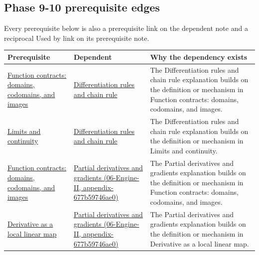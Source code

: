\subsection{Phase 9-10 prerequisite edges}\label{appendix-4ad47bdd269a-phase-9-10-prerequisite-edges}

Every prerequisite below is also a prerequisite link on the dependent note and a reciprocal Used by link on its prerequisite note.

{\def\LTcaptype{none} %
\begin{longtable}[]{@{}
  >{\raggedright\arraybackslash}p{}
  >{\raggedright\arraybackslash}p{}
  >{\raggedright\arraybackslash}p{}@{}}
\toprule\noalign{}
\begin{minipage}[b]{\linewidth}\raggedright
Prerequisite
\end{minipage} & \begin{minipage}[b]{\linewidth}\raggedright
Dependent
\end{minipage} & \begin{minipage}[b]{\linewidth}\raggedright
Why the dependency exists
\end{minipage} \\
\midrule\noalign{}
\endhead
\bottomrule\noalign{}
\endlastfoot
\hyperref[appendix-a59658325cd6]{Function contracts: domains, codomains, and images} & \hyperref[appendix-d9f70bdfbc92]{Differentiation rules and chain rule} & The Differentiation rules and chain rule explanation builds on the definition or mechanism in Function contracts: domains, codomains, and images. \\
\hyperref[appendix-fecc1847f5a3]{Limits and continuity} & \hyperref[appendix-d9f70bdfbc92]{Differentiation rules and chain rule} & The Differentiation rules and chain rule explanation builds on the definition or mechanism in Limits and continuity. \\
\hyperref[appendix-a59658325cd6]{Function contracts: domains, codomains, and images} & \href{../06-Engine-II/main.pdf\#nameddest=appendix-677b59746ae0}{Partial derivatives and gradients (06-Engine-II, appendix-677b59746ae0)} & The Partial derivatives and gradients explanation builds on the definition or mechanism in Function contracts: domains, codomains, and images. \\
\hyperref[appendix-7bc181935c42]{Derivative as a local linear map} & \href{../06-Engine-II/main.pdf\#nameddest=appendix-677b59746ae0}{Partial derivatives and gradients (06-Engine-II, appendix-677b59746ae0)} & The Partial derivatives and gradients explanation builds on the definition or mechanism in Derivative as a local linear map. \\

\end{longtable}}
